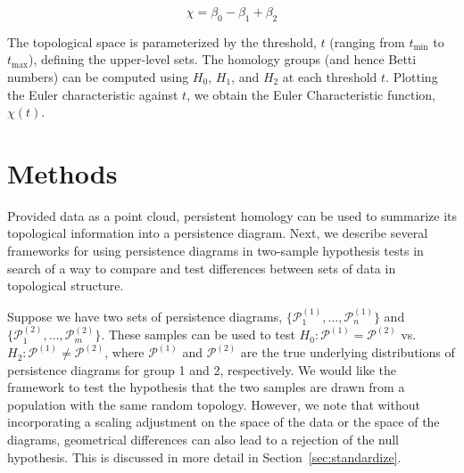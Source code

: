 \documentclass[12pt]{article}
\begin{document}
\[ \chi = \beta_{0} - \beta_{1} + \beta_{2} \]

The topological space is parameterized by the threshold, $t$ (ranging from $t_{\min}$ to $t_{\max}$), defining the upper-level sets. The homology groups (and hence Betti numbers) can be computed using $H_{0}$, $H_{1}$, and $H_{2}$ at each threshold $t$. Plotting the Euler characteristic against $t$, we obtain the Euler Characteristic function, $\chi(t)$. 


\section{Methods}
\label{sec:methods}
Provided data as a point cloud, persistent homology can be used to summarize its topological information into a persistence diagram. Next, we describe several frameworks for using persistence diagrams in two-sample hypothesis tests in search of a way to compare and test differences between sets of data in topological structure.  

\begin{sloppypar}
Suppose we have two sets of persistence diagrams, $\{\mathcal P_1^{(1)}, \ldots, \mathcal P_n^{(1)}\}$ and $\{\mathcal P_1^{(2)}, \ldots, \mathcal P_m^{(2)}\}$.  These samples can be used to test $H_0: \mathcal 
P^{(1)} = \mathcal P^{(2)}$ vs. $H_2: \mathcal P^{(1)} \neq \mathcal P^{(2)}$, where $\mathcal P^{(1)}$ and $\mathcal P^{(2)}$ are the true underlying 
distributions of persistence diagrams for group 1 and 2, respectively. We would like the framework to test the hypothesis that the two samples are drawn from a population with the same random topology. However, we note that without incorporating a scaling adjustment on the space of the data or the space of the diagrams, geometrical differences can also lead to a rejection of the null hypothesis. This is discussed in more detail in Section~\ref{sec:standardize}. 
\end{sloppypar}
\end{document}
